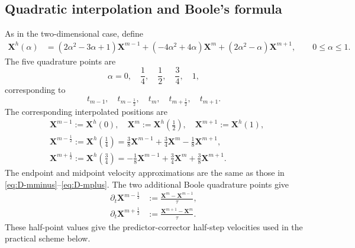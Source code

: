 \documentclass[smallextended]{svjour3}
\numberwithin{equation}{section}
\begin{document}
	\subsection{Quadratic interpolation and Boole's formula}
	
	As in the two-dimensional case, define
	\begin{equation}
		\begin{aligned}
			\mathbf{X}^h(\alpha)
			&=
			(2\alpha^2-3\alpha+1)\mathbf{X}^{m-1}
			+(-4\alpha^2+4\alpha)\mathbf{X}^{m}
			+(2\alpha^2-\alpha)\mathbf{X}^{m+1},
			\qquad 0\le\alpha\le1.
		\end{aligned}
		\label{eq:quad-Y-3d}
	\end{equation}
	The five quadrature points are
	\[
	\alpha=0,\quad \frac14,\quad \frac12,\quad \frac34,\quad 1,
	\]
	corresponding to
	\[
	t_{m-1},\quad t_{m-\frac12},\quad t_m,\quad t_{m+\frac12},\quad t_{m+1}.
	\]
	The corresponding interpolated positions are
	\begin{align}
		&\mathbf{X}^{m-1} := \mathbf{X}^h(0), \quad \mathbf{X}^{m} := \mathbf{X}^h\!\left(\frac12\right), \quad \mathbf{X}^{m+1} := \mathbf{X}^h(1),
		\\
		&\mathbf{X}^{m-\frac12}
		:=\mathbf{X}^h\!\left(\frac14\right)
		=
		\frac38\mathbf{X}^{m-1}
		+\frac34\mathbf{X}^{m}
		-\frac18\mathbf{X}^{m+1},\\
		&\mathbf{X}^{m+\frac12}
		:=
		\mathbf{X}^h\!\left(\frac34\right)
		=
		-\frac18\mathbf{X}^{m-1}
		+\frac34\mathbf{X}^{m}
		+\frac38\mathbf{X}^{m+1}.
		\label{eq:Y-half}
	\end{align}
	The endpoint and midpoint velocity approximations are the same as those in \eqref{eq:D-mminus}--\eqref{eq:D-mplus}. The two additional Boole quadrature points give
	\begin{align}
		\partial_t\mathbf X^{m-\frac12}
		&:=
		\frac{\mathbf X^{m}-\mathbf X^{m-1}}{\tau},
		\label{eq:D-3d-mhalf}
		\\
		\partial_t\mathbf X^{m+\frac12}
		&:=
		\frac{\mathbf X^{m+1}-\mathbf X^{m}}{\tau}.
		\label{eq:D-3d-phalf}
	\end{align}
	These half-point values give the predictor-corrector half-step velocities used in the practical scheme below.
	
\end{document}
